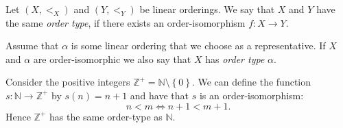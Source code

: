 \documentclass[../../main.tex]{subfiles}
\begin{document}
\begin{definition}\cite[Definitions 1.12, 1.13]{Ros82}
    Let $(X, <_X)$ and $(Y, <_Y)$ be linear orderings.
    We say that $X$ and $Y$ have the same \textit{order type}, if there exists an order-isomorphism $f: X \to Y$.

    Assume that $\alpha$ is some linear ordering that we choose as a representative.
    If $X$ and $\alpha$ are order-isomorphic we also say that $X$ has \textit{order type} $\alpha$.
\end{definition}

\begin{example}
    Consider the positive integers $\mathbb{Z}^+ = \mathbb{N} \setminus \left\{0\right\}$.
    We can define the function $s: \mathbb{N} \to \mathbb{Z^+}$ by $s(n) = n + 1$ and have that $s$ is an order-isomorphism:
    $$n < m \iff n+1 < m+1.$$
    Hence $\mathbb{Z}^+$ has the same order-type as $\mathbb{N}$.
\end{example}
\end{document}
